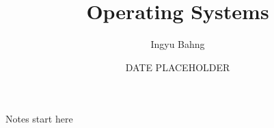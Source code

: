 \documentclass[10pt]{article}
\title{Operating Systems}
\date{DATE PLACEHOLDER}
\author{Ingyu Bahng}
\begin{document}


Notes start here
  
\end{document}
